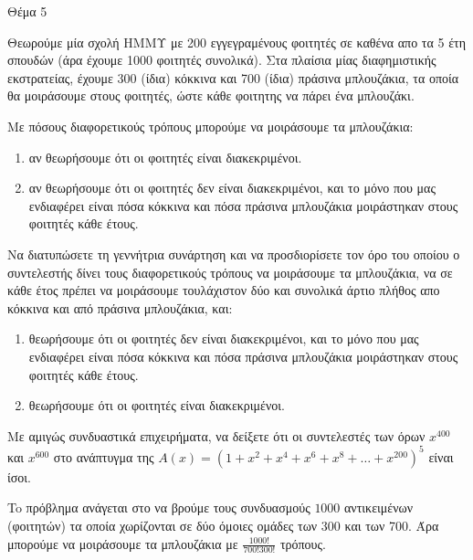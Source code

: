\documentclass{assignment}
\begin{document}
\begin{problem}{Θέμα 5}

Θεωρούμε μία σχολή ΗΜΜΥ με 200 εγγεγραμένους φοιτητές σε καθένα απο τα 5 έτη σπουδών (άρα έχουμε 1000 φοιτητές συνολικά). Στα
πλαίσια μίας διαφημιστικής εκστρατείας, έχουμε 300 (ίδια) κόκκινα και 700 (ίδια) πράσινα μπλουζάκια, τα οποία θα μοιράσουμε
στους φοιτητές, ώστε κάθε φοιτητης να πάρει ένα μπλουζάκι.

 Με πόσους διαφορετικούς τρόπους μπορούμε να μοιράσουμε τα μπλουζάκια:

\begin{enumerate}[1.]
\item αν θεωρήσουμε ότι οι φοιτητές είναι διακεκριμένοι.
\item αν θεωρήσουμε ότι οι φοιτητές δεν είναι διακεκριμένοι, και το μόνο που μας ενδιαφέρει είναι πόσα κόκκινα 
και πόσα πράσινα μπλουζάκια μοιράστηκαν στους φοιτητές κάθε έτους.
\end{enumerate}

 Να διατυπώσετε τη γεννήτρια συνάρτηση και να προσδιορίσετε τον όρο του οποίου ο συντελεστής δίνει τους 
διαφορετικούς τρόπους να μοιράσουμε τα μπλουζάκια, να σε κάθε έτος πρέπει να μοιράσουμε τουλάχιστον δύο και συνολικά άρτιο
πλήθος απο κόκκινα και από πράσινα μπλουζάκια, και:
\begin{enumerate}[1.]
\item θεωρήσουμε ότι οι φοιτητές δεν είναι διακεκριμένοι, και το μόνο που μας ενδιαφέρει είναι πόσα κόκκινα και πόσα πράσινα
μπλουζάκια μοιράστηκαν στους φοιτητές κάθε έτους.
\item θεωρήσουμε ότι οι φοιτητές είναι διακεκριμένοι.
\end{enumerate}

 Με αμιγώς συνδυαστικά επιχειρήματα, να δείξετε ότι οι συντελεστές των όρων $x^{400}$ και $x^{600}$ στο
ανάπτυγμα της $A(x) = (1 + x^2 + x^4 + x^6 + x^8 + \dots + x^{200})^5$ είναι ίσοι.

\solution

\answer To πρόβλημα ανάγεται στο να βρούμε τους συνδυασμούς $1000$ αντικειμένων (φοιτητών) τα οποία χωρίζονται σε δύο 
όμοιες ομάδες των 300 και των 700. Άρα μπορούμε να μοιράσουμε τα μπλουζάκια με $\frac{1000!}{700!300!}$ τρόπους.

\end{problem}
\end{document}
